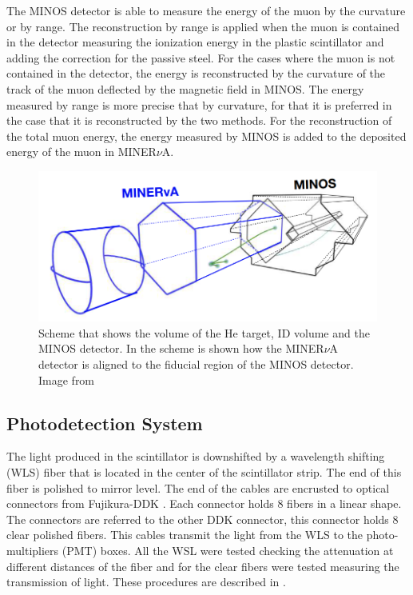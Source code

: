The MINOS detector is able to measure the energy of the muon by the curvature or by range. The reconstruction by range is applied when the muon is contained in the detector measuring the ionization energy in the plastic scintillator and adding the correction for the passive steel. For the cases where the muon is not contained in the detector, the energy is reconstructed by the curvature of the track of the muon deflected by the magnetic field in MINOS. The energy measured by range is more precise that by curvature, for that it is preferred in the case that it is reconstructed by the two methods. For the reconstruction of the total muon energy, the energy measured by MINOS is added to the deposited energy of the muon in MINER$\nu$A. 


\begin{figure}[!htb]
    \centering
    \includegraphics[scale=0.4]{Figures/Chapter2/MnvMINOS.png}
    \caption{Scheme that shows the volume of the He target, ID volume and the MINOS detector. In the scheme is shown how the MINER$\nu$A detector is aligned to the fiducial region of the MINOS detector. Image from \cite{MarvinThesis}}
    \label{fig:MnvExp:MnvDetector:WholeMINERvADet}
\end{figure}

\subsection{Photodetection System}
\label{Cap:MnvExp:MnvDetector:PhotoDetectionSystem}

The light produced in the scintillator is downshifted by a wavelength shifting (WLS) fiber that is located in the center of the scintillator strip. The end of this fiber is polished to mirror level. The end of the cables are encrusted to optical connectors from Fujikura-DDK \cite{OpticalConnector}. Each connector holds 8 fibers in a linear shape. The connectors are referred to the other DDK connector, this connector holds 8 clear polished fibers. This cables transmit the light from the WLS to the photo-multipliers (PMT) boxes. All the WSL were tested checking the attenuation at different distances of the fiber and for the clear fibers were tested measuring the transmission of light. These procedures are described in \cite{ALIAGA2014130}.

